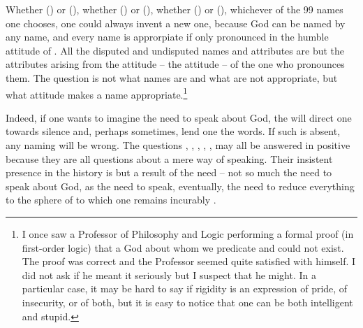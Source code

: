 Whether  () or  (),
whether  () or  (), whether
 () or  (), whichever
of the 99 names one chooses, one could always invent a new one,
because God can be named by any name, and every name is approrpiate if
only pronounced in the humble attitude of .  All the disputed
and undisputed names and attributes are but the attributes arising
from the attitude -- the  attitude -- of the one who
pronounces them.  The question is not what names are and what are not
appropriate, but what attitude makes a name appropriate.\footnote{I
once saw a Professor of Philosophy and Logic performing a formal proof
(in first-order logic) that a God about whom we predicate
 and  could not exist.  The proof was
correct and the Professor seemed quite satisfied with himself.  I did
not ask if he meant it seriously but I suspect that he might.  In a
particular case, it may be hard to say if rigidity is an expression of
pride, of insecurity, or of both, but it is easy to notice that one
can be both intelligent and stupid.} 

\subpa Indeed, if one wants to imagine the need to speak about God, 
the  will direct one towards
silence and, perhaps sometimes, lend one the words.   If such  is absent, any naming 
will be wrong.
%
The questions , , , , ,  may all be answered in positive because they are all
questions about a mere way of speaking.  
Their insistent presence in the history is but a result of the 
need -- not so much the need to speak about God, as the need to 
speak, eventually, the need to reduce everything to the sphere of 
 to which one remains incurably . 

